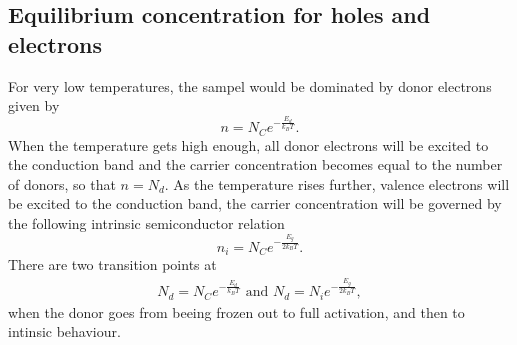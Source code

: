 \documentclass[11pt]{amsart}
\begin{document}
\subsection{Equilibrium concentration for holes and electrons}
For very low temperatures, the sampel would be dominated by donor electrons given by
\begin{equation}
n = N_C e^{-\frac{E_d}{k_B T}}.
\end{equation}
When the temperature gets high enough, all donor electrons will be excited to the conduction band and the carrier concentration becomes equal to the number of donors, so that $n=N_d$. As the temperature rises further, valence electrons will be excited to the conduction band, the carrier concentration will be governed by the following intrinsic semiconductor relation
\begin{equation}
n_i = N_C e^{-\frac{E_g}{2k_BT}}.
\end{equation}
There are two transition points at
\begin{align*}
N_d = N_Ce^{-\frac{E_d}{k_BT}} \text{ and } N_d = N_ie^{-\frac{E_g}{2k_BT}},
\end{align*}
when the donor goes from beeing frozen out to full activation, and then to intinsic behaviour.
\end{document}
